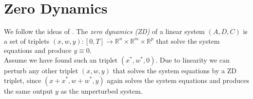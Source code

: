\section{Zero Dynamics}
We follow the ideas of \cite{BergerIlchmann}. 
The \textit{zero dynamics (ZD)} of a linear system $(A,D,C)$ is a set of 
triplets $(x,w,y):[0,T]\to \mathbb{R}^n\times \mathbb{R}^m \times \mathbb{R}^p$ that solve 
the system equations and produce $y\equiv 0$.\\

Assume we have found such an triplet 
$(x^*,w^*,0)$. Due to linearity we can perturb any other triplet $(x,w,y)$ that solves the 
system equations by a ZD triplet, since
$(x+x^*,w+w^*,y)$ again solves the system equations and produces the same output $y$ as 
the unperturbed system. \\

%	

